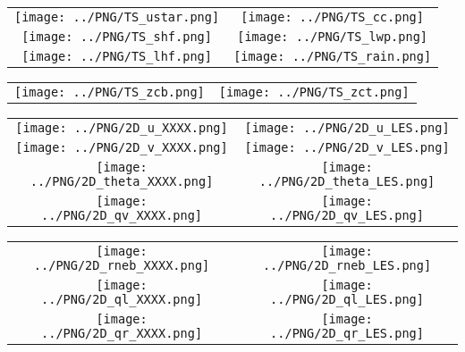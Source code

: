 \documentclass{article}
\begin{document}

\begin{table}
  \begin{tabular}{cc}
    \texttt{[image: ../PNG/TS\_ustar.png]} & \texttt{[image: ../PNG/TS\_cc.png]}   \\ 
    \texttt{[image: ../PNG/TS\_shf.png]}   & \texttt{[image: ../PNG/TS\_lwp.png]}  \\
    \texttt{[image: ../PNG/TS\_lhf.png]}   & \texttt{[image: ../PNG/TS\_rain.png]}
  \end{tabular}
\end{table}

\newpage

\begin{table}
  \begin{tabular}{cc}
    \texttt{[image: ../PNG/TS\_zcb.png]} &  \texttt{[image: ../PNG/TS\_zct.png]}
  \end{tabular}
\end{table}

\newpage

\begin{table}
  \begin{tabular}{cc}
     \texttt{[image: ../PNG/2D\_u\_XXXX.png]}     & \texttt{[image: ../PNG/2D\_u\_LES.png]}     \\
     \texttt{[image: ../PNG/2D\_v\_XXXX.png]}     & \texttt{[image: ../PNG/2D\_v\_LES.png]}     \\
     \texttt{[image: ../PNG/2D\_theta\_XXXX.png]} & \texttt{[image: ../PNG/2D\_theta\_LES.png]} \\
     \texttt{[image: ../PNG/2D\_qv\_XXXX.png]}    & \texttt{[image: ../PNG/2D\_qv\_LES.png]}
  \end{tabular}
\end{table}

\newpage

\begin{table}
  \begin{tabular}{cc}
     \texttt{[image: ../PNG/2D\_rneb\_XXXX.png]} & \texttt{[image: ../PNG/2D\_rneb\_LES.png]} \\
     \texttt{[image: ../PNG/2D\_ql\_XXXX.png]}   & \texttt{[image: ../PNG/2D\_ql\_LES.png]}   \\
     \texttt{[image: ../PNG/2D\_qr\_XXXX.png]}   & \texttt{[image: ../PNG/2D\_qr\_LES.png]}
  \end{tabular}
\end{table}
\end{document}
